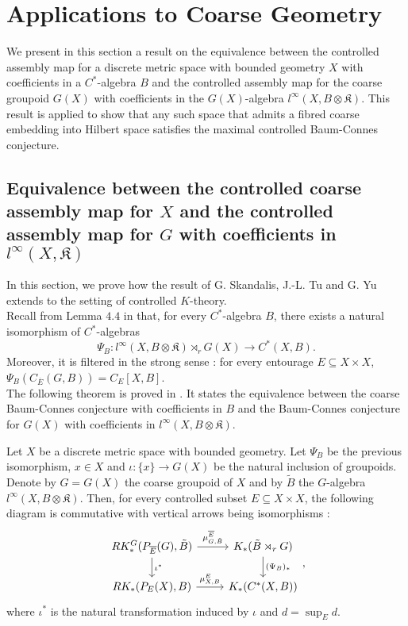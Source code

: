 \section{Applications to Coarse Geometry}

We present in this section a result on the equivalence between the controlled assembly map for a discrete metric space with bounded geometry $X$ with coefficients in a $C^*$-algebra $B$ and the controlled assembly map for the coarse groupoid $G(X)$ with coefficients in the $G(X)$-algebra $l^\infty(X,B\otimes \mathfrak K)$. This result is applied to show that any such space that admits a fibred coarse embedding into Hilbert space satisfies the maximal controlled Baum-Connes conjecture.

\subsection{Equivalence between the controlled coarse assembly map for $X$ and the controlled assembly map for $G$ with coefficients in $l^\infty(X,\mathfrak K)$}

In this section, we prove how the result of G. Skandalis, J.-L. Tu and G. Yu \cite{SkTuYu} extends to the setting of controlled $K$-theory. \\

Recall from Lemma $4.4$ in \cite{SkTuYu} that, for every $C^*$-algebra $B$, there exists a natural isomorphism of $C^*$-algebras 
\[\Psi_B : l^\infty(X,B\otimes\mathfrak K)\rtimes_r G(X)\rightarrow C^*(X,B).\]
Moreover, it is filtered in the strong sense : for every entourage $E\subseteq X\times X$, $\Psi_B(C_{\overline E}(G,B))= C_E[X,B]$.\\

The following theorem is proved in \cite{SkTuYu}. It states the equivalence between the coarse Baum-Connes conjecture with coefficients in $B$ and the Baum-Connes conjecture for $G(X)$ with coefficients in $l^\infty(X,B\otimes\mathfrak K)$.  

\begin{thm}
Let $X$ be a discrete metric space with bounded geometry. Let $\Psi_B$ be the previous isomorphism, $x\in X$ and $\iota :\{x\}\rightarrow G(X)$ be the natural inclusion of groupoids. Denote by $G=G(X)$ the coarse groupoid of $X$ and by $\tilde B$ the $G$-algebra $l^\infty (X,B\otimes\mathfrak K)$. Then, for every controlled subset $E\subseteq X\times X$, the following diagram is commutative with vertical arrows being isomorphisms :
\[\begin{tikzcd}
RK_*^G(P_{\overline{E}}(G),\tilde B) \arrow{r}{\mu_{G,\tilde B}^{\overline E}}\arrow{d}{\iota^*}& K_*(\tilde B\rtimes_r G)\arrow{d}{(\Psi_B)_*}\\
RK_*(P_E(X),B) \arrow{r}{\mu_{X,B}^E}& K_*(C^*(X,B))
\end{tikzcd},\]
where $\iota^*$ is the natural transformation induced by $\iota$ and $d= \sup_E d$.
\end{thm}

